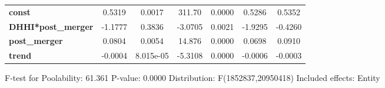 \documentclass{report}
\begin{document}
\begin{center}
\begin{tabular}{lcccccc}
\midrule
\textbf{const}             &       0.5319       &       0.0017       &      311.70     &      0.0000      &       0.5286      &       0.5352       \\
\textbf{DHHI*post\_merger} &      -1.1777       &       0.3836       &     -3.0705     &      0.0021      &      -1.9295      &      -0.4260       \\
\textbf{post\_merger}      &       0.0804       &       0.0054       &      14.876     &      0.0000      &       0.0698      &       0.0910       \\
\textbf{trend}             &      -0.0004       &     8.015e-05      &     -5.3108     &      0.0000      &      -0.0006      &      -0.0003       \\
\bottomrule
\end{tabular}
\end{center}

F-test for Poolability: 61.361 \newline
 P-value: 0.0000 \newline
 Distribution: F(1852837,20950418) \newline
  \newline
 Included effects: Entity
\end{document}
